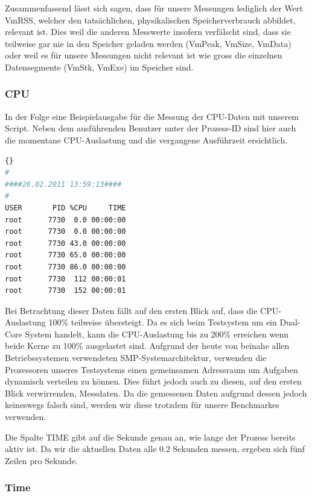 \documentclass{fancydocument}
\begin{document}
\newpage
Zusammenfassend lässt sich sagen, dass für unsere Messungen lediglich der Wert VmRSS, welcher den tatsächlichen, physikalischen Speicherverbrauch abbildet, relevant ist. Dies weil die anderen Messwerte insofern verfälscht sind, dass sie teilweise gar nie in den Speicher geladen werden (VmPeak, VmSize, VmData) oder weil es für unsere Messungen nicht relevant ist wie gross die einzelnen Datensegmente (VmStk, VmExe) im Speicher sind.

\subsubsection{CPU}
In der Folge eine Beispielausgabe für die  Messung der CPU-Daten mit unserem Script. Neben dem ausführenden Benutzer unter der Prozess-ID sind hier auch die momentane CPU-Auslastung und die vergangene Ausführzeit ersichtlich.

\begin{minipage}{\textwidth}
\begin{lstlisting}[language=bash,caption=Speicherdaten]{}
#
####26.02.2011 13:59:13####
#
USER       PID %CPU     TIME
root      7730  0.0 00:00:00
root      7730  0.0 00:00:00
root      7730 43.0 00:00:00
root      7730 65.0 00:00:00
root      7730 86.0 00:00:00
root      7730  112 00:00:01
root      7730  152 00:00:01
\end{lstlisting}
\end{minipage}

Bei Betrachtung dieser Daten fällt auf den ersten Blick auf, dass die CPU-Auslastung 100\% teilweise übersteigt. Da es sich beim Testsystem um ein Dual-Core System handelt, kann die CPU-Auslastung bis zu 200\% erreichen wenn beide Kerne zu 100\% ausgelastet sind. Aufgrund der heute von beinahe allen Betriebssystemen verwendeten SMP-Systemarchitektur, verwenden die Prozessoren unseres Testsystems einen gemeinsamen Adressraum um Aufgaben dynamisch verteilen zu können. Dies führt jedoch auch zu diesen, auf den ersten Blick verwirrenden, Messdaten. Da die gemessenen Daten aufgrund dessen jedoch keineswegs falsch sind, werden wir diese trotzdem für unsere Benchmarkes verwenden.

Die Spalte TIME gibt auf die Sekunde genau an, wie lange der Prozess bereits aktiv ist. Da wir die aktuellen Daten alle 0.2 Sekunden messen, ergeben sich fünf Zeilen pro Sekunde.

\subsubsection{Time}
\end{document}
